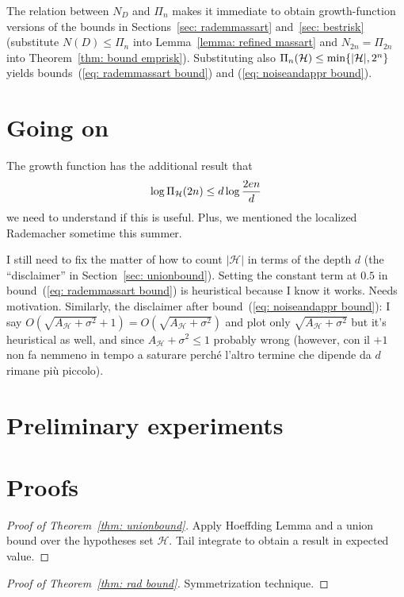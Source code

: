 \documentclass[reqno]{amsart}
\begin{document}
The relation between $N_D$ and $\Pi_n$ makes it immediate to obtain growth-function versions of the bounds in Sections~\ref{sec: rademmassart} and~\ref{sec: bestrisk} (substitute $N(D)\le\Pi_n$ into Lemma~\ref{lemma: refined massart} and $N_{2n} = \Pi_{2n}$ into Theorem~\ref{thm: bound emprisk}). Substituting also $\Pi_{n}(\mathcal H)\le\min\{\vert \mathcal{H} \vert,2^n\}$ yields bounds~(\ref{eq: rademmassart bound}) and (\ref{eq: noiseandappr bound}). 

\section{Going on}
The growth function has the additional result that
\[
 \log\Pi_{\mathcal{H}}(2n)\le d\log\frac{2en}{d}
\]
we need to understand if this is useful. Plus, we mentioned the localized Rademacher sometime this summer. 

I still need to fix the matter of how to count $\vert \mathcal H \vert$ in terms of the depth $d$ (the ``disclaimer'' in Section~\ref{sec: unionbound}).
Setting the constant term at $0.5$ in bound~(\ref{eq: rademmassart bound}) is heuristical because I know it works. Needs motivation.
Similarly, the disclaimer after bound~(\ref{eq: noiseandappr bound}): I say $O(\sqrt{A_{\mathcal H}+\sigma^2} + 1) = O(\sqrt{A_{\mathcal H}+\sigma^2})$ and plot only $\sqrt{A_{\mathcal H}+\sigma^2}$ but it's heuristical as well, and since $A_{\mathcal H}+\sigma^2 \le 1$ probably wrong (however, con il $+1$ non fa nemmeno in tempo a saturare perché l'altro termine che dipende da $d$ rimane più piccolo). 

\newpage
\appendix
\section{Preliminary experiments}\label{app: prel exp}

\section{Proofs}\label{app: proofs}
\begin{proof}[Proof of Theorem~\ref{thm: unionbound}]
  Apply Hoeffding Lemma and a union bound over the hypotheses set $\mathcal H$. Tail integrate to obtain a result in expected value. 
\end{proof}

\begin{proof}[Proof of Theorem~\ref{thm: rad bound}]
  Symmetrization technique. 
\end{proof}
\end{document}
